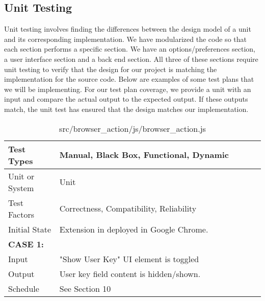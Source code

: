 \documentclass[12pt]{article}
\begin{document}
\subsection{Unit Testing}
Unit testing involves finding the differences between the design model of a unit and its corresponding implementation. We have modularized the code so that each section performs a specific section. We have an options/preferences section, a user interface section and a back end section. All three of these sections require unit testing to verify that the design for our project is matching the implementation for the source code. Below are examples of some test plans that we will be implementing. For our test plan coverage, we provide a unit with an input and compare the actual output to the expected output. If these outputs match, the unit test has ensured that the design matches our implementation.  

\begin{table}
\caption{src/browser\_action/js/browser\_action.js}
\begin{tabular}{|p{0.2\linewidth} || p{0.8\linewidth}|}
\hline
Test Types & Manual, Black Box, Functional, Dynamic \\
\hline
Unit or System & Unit \\
\hline
Test Factors & Correctness, Compatibility, Reliability\\
\hline
Initial State & Extension in deployed in Google Chrome. \\
\hline
\hline
\textbf{CASE 1:} & \\
Input & "Show User Key" UI element is toggled \\
\hline
Output & User key field content is hidden/shown. \\
\hline
Schedule & See Section 10 \\
\hline
\end{tabular}
\end{table}
\end{document}
